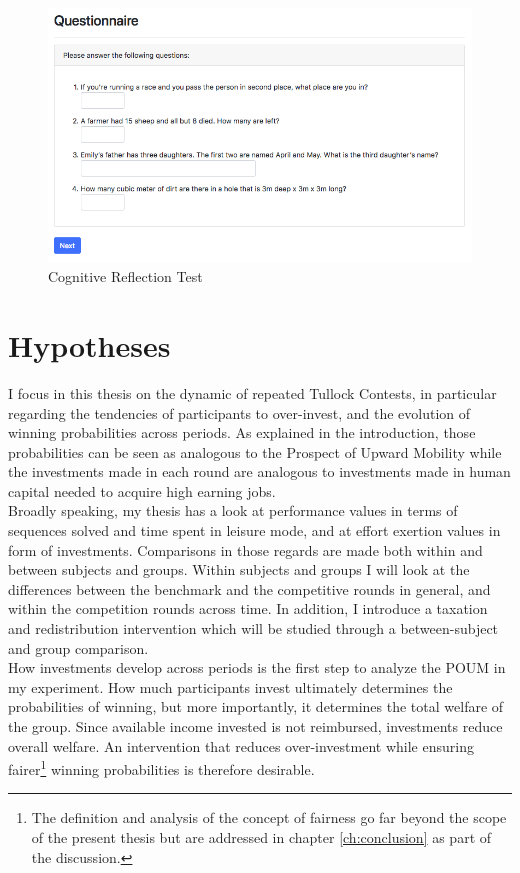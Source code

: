     \begin{figure}
        \centering
        \includegraphics[width=\textwidth]{graphs/CRT_Quest.png}
        \caption{Cognitive Reflection Test \citep{thomson2016}}
        \label{fig:crt_quest}
    \end{figure}
    
    \section{Hypotheses}\label{sec:hyp}
    
    I focus in this thesis on the dynamic of repeated Tullock Contests, in particular regarding the tendencies of participants to over-invest, and the evolution of winning probabilities across periods. As explained in the introduction, those probabilities can be seen as analogous to the Prospect of Upward Mobility while the investments made in each round are analogous to investments made in human capital needed to acquire high earning jobs.\\
    
    Broadly speaking, my thesis has a look at performance values in terms of sequences solved and time spent in leisure mode, and at effort exertion values in form of investments. Comparisons in those regards are made both within and between subjects and groups. Within subjects and groups I will look at the differences between the benchmark and the competitive rounds in general, and within the competition rounds across time. In addition, I introduce a taxation and redistribution intervention which will be studied through a between-subject and group comparison.\\
    
    How investments develop across periods is the first step to analyze the POUM in my experiment. How much participants invest ultimately determines the probabilities of winning, but more importantly, it determines the total welfare of the group. Since available income invested is not reimbursed, investments reduce overall welfare. An intervention that reduces over-investment while ensuring fairer\footnote{The definition and analysis of the concept of fairness go far beyond the scope of the present thesis but are addressed in chapter \ref{ch:conclusion} as part of the discussion.} winning probabilities is therefore desirable.\\
    
